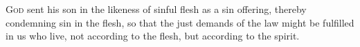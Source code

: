 
\lettrine{G}{od} sent his son in the likeness of sinful flesh as a sin offering, thereby condemning sin in the flesh, so that the just demands of the law might be fulfilled in us who live, not according to the flesh, but according to the spirit.
